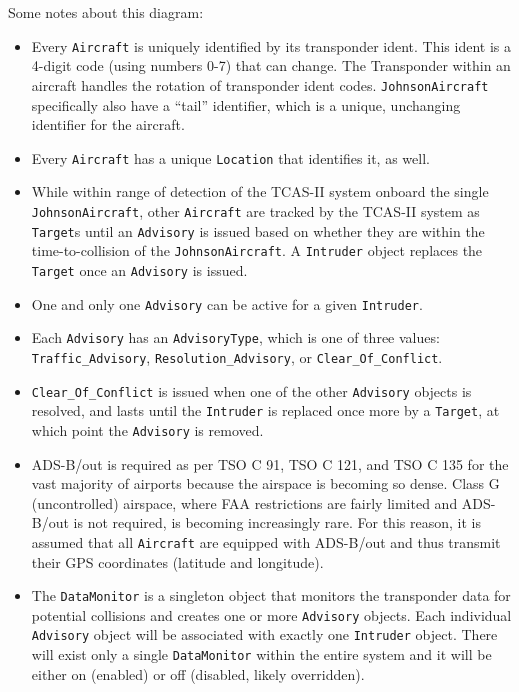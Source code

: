 \documentclass[conference]{IEEEtran}
\begin{document}
Some notes about this diagram:
\begin{itemize}
    \item Every \texttt{Aircraft} is uniquely identified by its transponder ident. This ident is a 4-digit code (using numbers 0-7) that can change. The Transponder within an aircraft handles the rotation of transponder ident codes. \texttt{JohnsonAircraft} specifically also have a ``tail'' identifier, which is a unique, unchanging identifier for the aircraft.
    \item Every \texttt{Aircraft} has a unique \texttt{Location} that identifies it, as well.
    \item While within range of detection of the TCAS-II system onboard the single \texttt{JohnsonAircraft}, other \texttt{Aircraft} are tracked by the TCAS-II system as \texttt{Target}s until an \texttt{Advisory} is issued based on whether they are within the time-to-collision of the \texttt{JohnsonAircraft}. A \texttt{Intruder} object replaces the \texttt{Target} once an \texttt{Advisory} is issued.
    \item One and only one \texttt{Advisory} can be active for a given \texttt{Intruder}.
    \item Each \texttt{Advisory} has an \texttt{AdvisoryType}, which is one of three values: \texttt{Traffic\_Advisory}, \texttt{Resolution\_Advisory}, or \texttt{Clear\_Of\_Conflict}.
    \item \texttt{Clear\_Of\_Conflict} is issued when one of the other \texttt{Advisory} objects is resolved, and lasts until the \texttt{Intruder} is replaced once more by a \texttt{Target}, at which point the \texttt{Advisory} is removed.
    \item ADS-B/out is required as per TSO C 91, TSO C 121, and TSO C 135 for the vast majority of airports because the airspace is becoming so dense. Class G (uncontrolled) airspace, where FAA restrictions are fairly limited and ADS-B/out is not required, is becoming increasingly rare. For this reason, it is assumed that all \texttt{Aircraft} are equipped with ADS-B/out and thus transmit their GPS coordinates (latitude and longitude).
    \item   The \texttt{DataMonitor} is a singleton object that monitors the transponder data for potential collisions and creates one or more \texttt{Advisory} objects. Each individual \texttt{Advisory} object will be associated with exactly one \texttt{Intruder} object. There will exist only a single \texttt{DataMonitor} within the entire system and it will be either on (enabled) or off (disabled, likely overridden).

\end{itemize}
\end{document}
